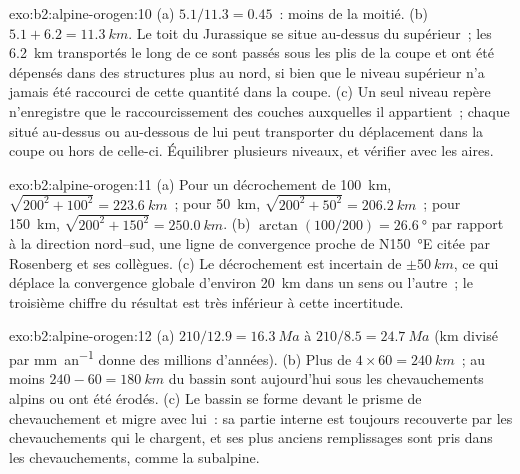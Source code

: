 \begin{solution}{exo:b2:alpine-orogen:10}
(a) $5.1/11.3 = 0.45$~: moins de la moitié. (b) $5.1 + 6.2 = \qty{11.3}{km}$. Le toit du
Jurassique se situe au-dessus du  supérieur~; les \qty{6.2}{km} transportés le long de ce 
sont passés sous les plis de la coupe et ont été dépensés dans des structures plus au nord, si bien que le
niveau supérieur n'a jamais été raccourci de cette quantité dans la coupe. (c) Un seul niveau repère n'enregistre
que le raccourcissement des couches auxquelles il appartient~; chaque  situé au-dessus ou au-dessous de lui peut
transporter du déplacement dans la coupe ou hors de celle-ci. Équilibrer plusieurs niveaux, et vérifier avec les aires.
\end{solution}

\begin{solution}{exo:b2:alpine-orogen:11}
(a) Pour un décrochement de \qty{100}{km}, $\sqrt{200^2 + 100^2} = \qty{223.6}{km}$~; pour
\qty{50}{km}, $\sqrt{200^2 + 50^2} = \qty{206.2}{km}$~; pour \qty{150}{km},
$\sqrt{200^2 + 150^2} = \qty{250.0}{km}$. (b) $\arctan(100/200) = \qty{26.6}{\degree}$ par rapport à
la direction nord--sud, une ligne de convergence proche de N\qty{150}{\degree}E citée par Rosenberg et
ses collègues. (c) Le décrochement est incertain de $\pm\qty{50}{km}$, ce qui déplace la convergence globale d'environ
\qty{20}{km} dans un sens ou l'autre~; le troisième chiffre du résultat est très inférieur à
cette incertitude.
\end{solution}

\begin{solution}{exo:b2:alpine-orogen:12}
(a) $210/12.9 = \qty{16.3}{Ma}$ à $210/8.5 = \qty{24.7}{Ma}$ (\unit{km} divisé par
\unit{mm.an^{-1}} donne des millions d'années). (b) Plus de $4\times60 = \qty{240}{km}$~; au
moins $240 - 60 = \qty{180}{km}$ du bassin sont aujourd'hui sous les chevauchements alpins ou ont été
érodés. (c) Le bassin se forme devant le prisme de chevauchement et migre avec lui~: sa partie interne est
toujours recouverte par les chevauchements qui le chargent, et ses plus anciens remplissages sont pris
dans les chevauchements, comme la  subalpine.
\end{solution}

